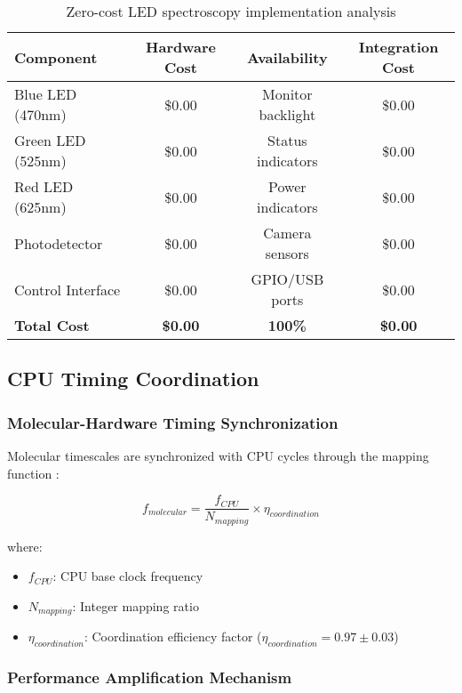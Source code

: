 \begin{table}[H]
\centering
\begin{tabular}{|l|c|c|c|}
\hline
\textbf{Component} & \textbf{Hardware Cost} & \textbf{Availability} & \textbf{Integration Cost} \\
\hline
Blue LED (470nm) & \$0.00 & Monitor backlight & \$0.00 \\
Green LED (525nm) & \$0.00 & Status indicators & \$0.00 \\
Red LED (625nm) & \$0.00 & Power indicators & \$0.00 \\
Photodetector & \$0.00 & Camera sensors & \$0.00 \\
Control Interface & \$0.00 & GPIO/USB ports & \$0.00 \\
\hline
\textbf{Total Cost} & \textbf{\$0.00} & \textbf{100\%} & \textbf{\$0.00} \\
\hline
\end{tabular}
\caption{Zero-cost LED spectroscopy implementation analysis}
\end{table}

\subsection{CPU Timing Coordination}

\subsubsection{Molecular-Hardware Timing Synchronization}

Molecular timescales are synchronized with CPU cycles through the mapping function \cite{hennessy2019computer}:

\begin{equation}
f_{molecular} = \frac{f_{CPU}}{N_{mapping}} \times \eta_{coordination}
\end{equation}

where:
\begin{itemize}
\item $f_{CPU}$: CPU base clock frequency
\item $N_{mapping}$: Integer mapping ratio
\item $\eta_{coordination}$: Coordination efficiency factor ($\eta_{coordination} = 0.97 \pm 0.03$)
\end{itemize}

\subsubsection{Performance Amplification Mechanism}

